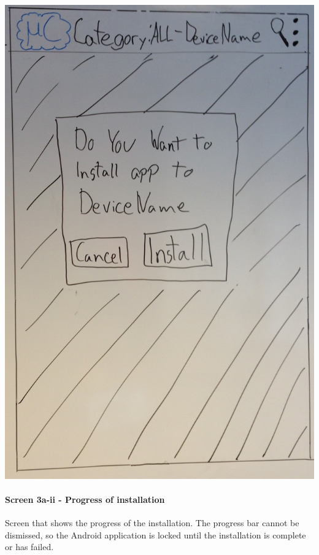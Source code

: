 \begin{image}[H]
\includegraphics[scale=0.2]{images/Design_guide/Screen3a-i.png}
\end{image}


\paragraph{Screen 3a-ii - Progress of installation}
Screen that shows the progress of the installation. The progress bar cannot be dismissed, so the Android application is locked until the installation is complete or has failed. 

